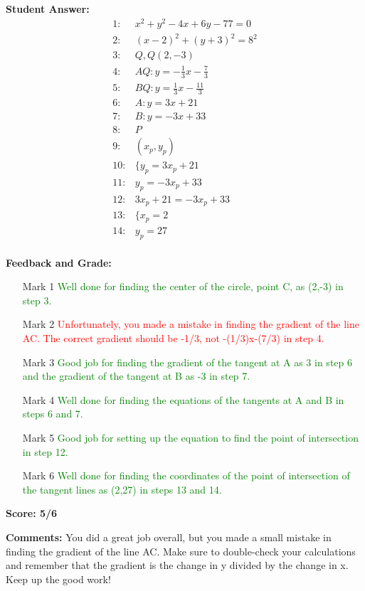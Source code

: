 \documentclass{article}
\begin{document}
\textbf{Student Answer:}
\begin{align*}
1: & x^2+y^2-4x+6y-77=0 \\
2: & (x-2)^2+(y+3)^2=8^2 \\
3: & Q,Q(2,-3) \\
4: & AQ:y=-\frac{1}{3}x-\frac{7}{3} \\
5: & BQ:y=\frac{1}{3}x-\frac{11}{3} \\
6: & A:y=3x+21 \\
7: & B:y=-3x+33 \\
8: & P \\
9: & (x_p,y_p) \\
10: & \{y_p=3x_p+21 \\
11: & y_p=-3x_p+33 \\
12: & 3x_p+21=-3x_p+33 \\
13: & \{x_p=2 \\
14: & y_p=27 \\
\end{align*}

\textbf{Feedback and Grade:}
\begin{itemize}
\item[Mark 1] \textcolor{green}{Well done for finding the center of the circle, point C, as (2,-3) in step 3.}
\item[Mark 2] \textcolor{red}{Unfortunately, you made a mistake in finding the gradient of the line AC. The correct gradient should be -1/3, not -(1/3)x-(7/3) in step 4.}
\item[Mark 3] \textcolor{green}{Good job for finding the gradient of the tangent at A as 3 in step 6 and the gradient of the tangent at B as -3 in step 7.}
\item[Mark 4] \textcolor{green}{Well done for finding the equations of the tangents at A and B in steps 6 and 7.}
\item[Mark 5] \textcolor{green}{Good job for setting up the equation to find the point of intersection in step 12.}
\item[Mark 6] \textcolor{green}{Well done for finding the coordinates of the point of intersection of the tangent lines as (2,27) in steps 13 and 14.}
\end{itemize}

\textbf{Score: 5/6}

\textbf{Comments:} You did a great job overall, but you made a small mistake in finding the gradient of the line AC. Make sure to double-check your calculations and remember that the gradient is the change in y divided by the change in x. Keep up the good work!
\end{document}
